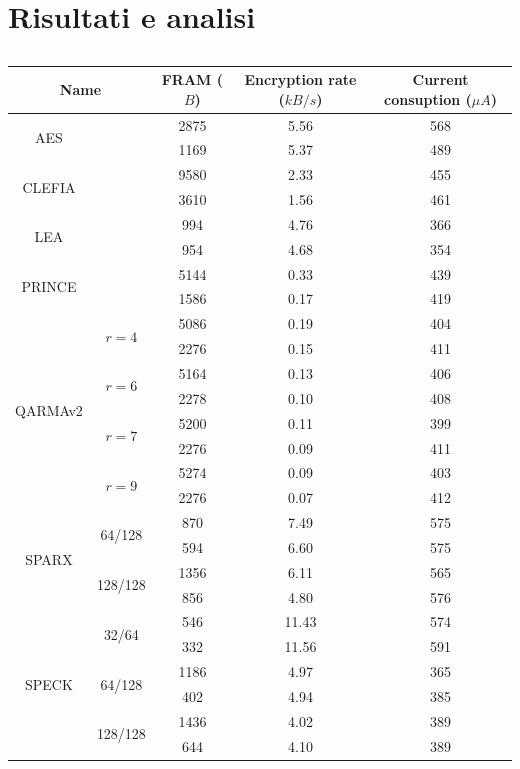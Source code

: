 \documentclass[target=bach,aauheader=,style=]{thud}
\begin{document}
	\section{Risultati e analisi}
	\begin{table}
		\begin{tabular}{ccccc}
			\hline
			\multicolumn{2}{c}{\textbf{Name}} & \textbf{FRAM ($B$)} & \textbf{Encryption rate ($kB/s$)} & \textbf{Current consuption} ($\mu A$) \\
			\hline
			\hline
		    \multirow{2}{*}{AES} & & 2875 & 5.56 & 568\\
		    					 & & 1169 & 5.37 & 489\\
		    \hline
		    \multirow{2}{*}{CLEFIA} & & 9580 & 2.33 & 455\\
		    						& & 3610 & 1.56 & 461\\
		    \hline
		    \multirow{2}{*}{LEA} & & 994 & 4.76 & 366\\
		    					 & & 954 & 4.68 & 354\\
		    \hline
		    \multirow{2}{*}{PRINCE} & & 5144 & 0.33 & 439\\
		    						& & 1586 & 0.17 & 419\\
		    \hline
		    \multirow{8}{*}{QARMAv2} & \multirow{2}{*}{$r=4$} & 5086 & 0.19 & 404\\
		    						 &						  & 2276 & 0.15 & 411\\
		    						 & \multirow{2}{*}{$r=6$} & 5164 & 0.13 & 406\\
		    						 &						  & 2278 & 0.10 & 408\\
		    						 & \multirow{2}{*}{$r=7$} & 5200 & 0.11 & 399\\
		    						 &						  & 2276 & 0.09 & 411\\
		    						 & \multirow{2}{*}{$r=9$} & 5274 & 0.09 & 403\\
		    						 &						  & 2276 & 0.07 & 412\\
			\hline
			\multirow{4}{*}{SPARX} & \multirow{2}{*}{64/128} & 870 & 7.49 & 575\\
								   &						 & 594 & 6.60 & 575\\
								   & \multirow{2}{*}{128/128} & 1356 & 6.11 & 565\\
								   &						  & 856 & 4.80 & 576\\
			\hline
			\multirow{6}{*}{SPECK} & \multirow{2}{*}{32/64} & 546 & 11.43 & 574\\
								   &						& 332 & 11.56 & 591\\
								   & \multirow{2}{*}{64/128} & 1186 & 4.97 & 365\\
								   &						 & 402 & 4.94 & 385\\
								   & \multirow{2}{*}{128/128} & 1436 & 4.02 & 389\\
								   &						 & 644 & 4.10 & 389\\
			\hline
		    
		\end{tabular}
		\caption{}
	\end{table}
\end{document}
